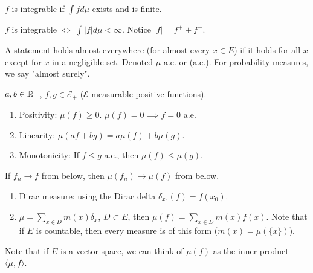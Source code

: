 \documentclass[12pt, titlepage]{article}
\begin{document}
\begin{dfn}{}
	$f$ is integrable if $\int f d\mu$ exists and is finite.\\
\end{dfn}

\begin{theo}[]{}
$f$ is integrable $\iff$ $\int |f| d\mu < \infty$. Notice $|f| = f^+ + f^-$.\\
\end{theo}

\begin{dfn}{}
	A statement holds almost everywhere (for almost every $x \in E$) if it holds for all $x$ except for $x$ in a negligible set. Denoted $\mu$-a.e. or (a.e.). For probability measures, we say "almost surely".
\end{dfn}

\begin{info}{}
$a, b \in \mathbb{R}^+$, $f, g \in \mathcal{E}_+$ ($\mathcal{E}$-measurable positive functions).

\begin{enumerate}
	\item Positivity: $\mu(f) \geq 0$. $\mu(f) = 0 \implies f = 0$ a.e.
	\item Linearity: $\mu(af + bg) = a\mu(f) + b\mu(g)$.
	\item Monotonicity: If $f \leq g$ a.e., then $\mu(f) \leq \mu(g)$.
\end{enumerate}
\end{info}

\begin{theo}{}
If $f_n \to f$ from below, then $\mu(f_n) \to \mu(f)$ from below.\\

\begin{enumerate}
	\item Dirac measure: using the Dirac delta $\delta_{x_0} (f) = f(x_0)$.\\
	\item $\mu = \sum_{x \in D} m(x)\delta_x$, $D \subset E$, then $\mu(f) = \sum_{x \in D} m(x) f(x)$. Note that if $E$ is countable, then every measure is of this form ($m(x) = \mu(\{x\})$).
\end{enumerate}

Note that if $E$ is a vector space, we can think of $\mu(f)$ as the inner product $\langle \mu, f \rangle$.\\
\end{theo}
\end{document}
